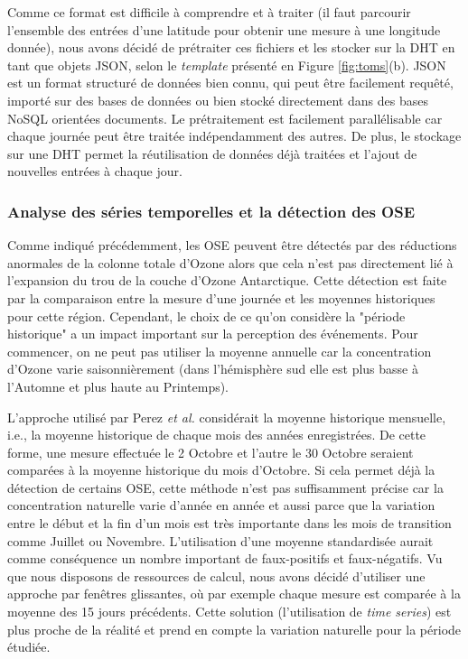 Comme ce format est difficile à comprendre et à traiter (il faut parcourir l'ensemble des entrées d'une latitude pour obtenir une mesure à une longitude donnée), nous avons décidé de prétraiter ces fichiers et les stocker sur la DHT en tant que objets JSON, selon le \textit{template} présenté en Figure \ref{fig:toms}(b). JSON est un format structuré de données bien connu, qui peut être facilement requêté, importé sur des bases de données ou bien stocké directement dans des bases NoSQL orientées  documents. Le prétraitement est facilement parallélisable car chaque journée peut être traitée indépendamment des autres. De plus, le stockage sur une DHT permet la réutilisation de données déjà traitées et l'ajout de nouvelles entrées à chaque jour. 

\subsubsection{Analyse des séries temporelles et la détection des OSE\label{sec:timeseries}}

Comme indiqué précédemment, les OSE peuvent être détectés par des réductions anormales de la colonne totale d'Ozone alors que cela n'est pas directement lié à l'expansion du trou de la couche d'Ozone Antarctique. Cette détection est faite par la comparaison entre la mesure d'une journée et les moyennes historiques pour cette région. Cependant, le choix de ce qu'on considère la "période historique" a un impact important sur la perception des événements. Pour commencer, on ne peut pas utiliser la moyenne annuelle car la concentration d'Ozone varie saisonnièrement (dans l'hémisphère sud elle est plus basse à l'Automne et plus haute au Printemps). 

L'approche utilisé par Perez \textit{et al. }\cite{Peres2013} considérait la moyenne historique mensuelle, i.e., la moyenne historique de chaque mois des années enregistrées. De cette forme, une mesure effectuée le 2 Octobre et l'autre le 30 Octobre seraient comparées à la moyenne historique du mois d'Octobre. Si cela permet déjà la détection de certains OSE, cette méthode n'est pas suffisamment précise car la concentration naturelle varie d'année en année et aussi parce que la variation entre le début et la fin d'un mois est très importante dans les mois de transition comme Juillet ou Novembre. L'utilisation d'une moyenne standardisée aurait comme conséquence un nombre important de faux-positifs et faux-négatifs. Vu que nous disposons de ressources de calcul, nous avons décidé d'utiliser une approche par fenêtres glissantes, où par exemple chaque mesure est comparée à la moyenne des 15 jours précédents. Cette solution (l'utilisation de \textit{time series}) est plus proche de la réalité et prend en compte la variation naturelle pour la période étudiée.

